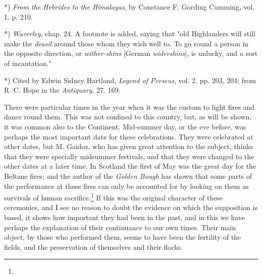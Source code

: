 \documentclass[a4paper, 11pt, oneside, polutonikogreek, english]{article}
\begin{document}
*) \emph{From the Hebrides to the Himalayas}, by Constance F. Gording Cumming, vol. 1. p. 210.

*) \emph{Waverley}, chap. 24. A footnote is added, saying that "old Highlanders will still make the \emph{deasil} around those whom they wish well to. To go round a person in the opposite direction, or \emph{wither-shins} [German \emph{widershīns}], is unlucky, and a sort of incantation."

*) Cited by Edwin Sidney Hartland, \emph{Legend of Perseus}, vol. 2. pp. 203, 204; from R. C. Hope in the \emph{Antiquary}, 27. 169.

There were particular times in the year when it was the custom to light fires and dance round them. This was not confined to this country, but, as will be shown, it was common also to the Continent. Mid-summer day, or the eve before, was perhaps the most important date for these celebrations. They were celebrated at other dates, but M. Gaidoz, who has given great attention to the subject, thinks that they were specially midsummer festivals, and that they were changed to the other dates at a later time. In Scotland the first of May was the great day for the Beltane fires; and the author of the \emph{Golden Bough} has shown that some parts of the performance at these fires can only be accounted for by looking on them as survivals of human sacrifice.\footnote{} If this was the original character of these ceremonies, and I see no reason to doubt the evidence on which the supposition is based, it shows how important they had been in the past, and in this we have perhaps the explanation of their continuance to our own times. Their main object, by those who performed them, seems to have been the fertility of the fields, and the preservation of themselves and their flocks.
\end{document}
